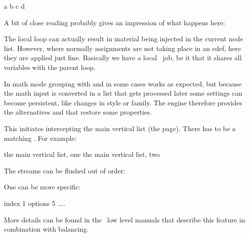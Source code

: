 \startbuffer
{}

\edef\whatever{
    a
    \beginlocalcontrol
        \advance\scratchcounter 10
        b
    \endlocalcontrol
    \beginlocalcontrol
        c
    \endlocalcontrol
    d
    \advance{}
}

\the\scratchcounter
\whatever
\the\scratchcounter
\stopbuffer

\typebuffer

A bit of close reading probably gives an impression of what happens here:

{\getbuffer}

The local loop can actually result in material being injected in the current node
list. However, where normally assignments are not taking place in an \prm
{edef}, here they are applied just fine. Basically we have a local \TEX\ job, be
it that it shares all variables with the parent loop.

\stopnewprimitive

\startnewprimitive[title={\prm {beginmathgroup}}]

In math mode grouping with  and  in some cases
works as expected, but because the math input is converted in a list that gets
processed later some settings can become persistent, like changes in style or
family. The engine therefore provides the alternatives  and
 that restore some properties.

\stopnewprimitive

\startnewprimitive[title={\prm {beginmvl}}]

This initiates intercepting the main vertical list (the page). There has to be a
matching . For example:

\starttyping
{} the main vertical list, one \endmvl
{} the main vertical list, two \endmvl
\stoptyping

The streams can be flushed out of order:

\starttyping
\setbox\scratchboxone{}
\setbox\scratchboxtwo{}
\stoptyping

One can be more specific:

\starttyping
\beginmvl
    index   1
    options 5 %
\relax
    ....
\endmvl
\stoptyping

More details can be found in the \CONTEXT\ low level manuals that describe this
feature in combination with balancing.

